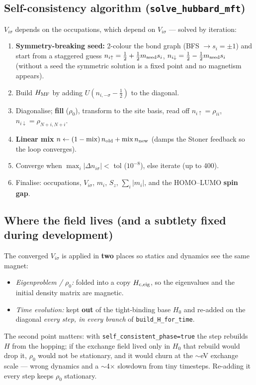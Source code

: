 \documentclass[11pt]{article}
\newcommand{\code}[1]{\texttt{\small #1}}
\begin{document}
\subsection{Self-consistency algorithm (\texttt{solve\_hubbard\_mft})}
$V_{i\sigma}$ depends on the occupations, which depend on $V_{i\sigma}$ --- solved
by iteration:
\begin{enumerate}
\item \textbf{Symmetry-breaking seed:} 2-colour the bond graph (BFS
$\to s_i=\pm1$) and start from a staggered guess
$n_{i\uparrow}=\tfrac12+\tfrac12 m_{\rm seed}s_i$,
$n_{i\downarrow}=\tfrac12-\tfrac12 m_{\rm seed}s_i$ (without a seed the symmetric
solution is a fixed point and no magnetism appears).
\item Build $H_{\rm MF}$ by adding $U(n_{i,-\sigma}-\tfrac12)$ to the diagonal.
\item Diagonalise; \textbf{fill} ($\rho_0$), transform to the site basis, read off
$n_{i\uparrow}=\rho_{ii}$, $n_{i\downarrow}=\rho_{N+i,N+i}$.
\item \textbf{Linear mix} $n\leftarrow(1-{\rm mix})\,n_{\rm old}+{\rm mix}\,n_{\rm new}$
(damps the Stoner feedback so the loop converges).
\item Converge when $\max_i|\Delta n_{i\sigma}|<$ tol ($10^{-8}$), else iterate
(up to 400).
\item Finalise: occupations, $V_{i\sigma}$, $m_i$, $S_z$, $\sum_i|m_i|$, and the
HOMO--LUMO \textbf{spin gap}.
\end{enumerate}

\subsection{Where the field lives (and a subtlety fixed during development)}
The converged $V_{i\sigma}$ is applied in \textbf{two} places so statics and
dynamics see the same magnet:
\begin{itemize}
\item \emph{Eigenproblem / $\rho_0$:} folded into a copy $H_{\rm c,eig}$, so the
eigenvalues and the initial density matrix are magnetic.
\item \emph{Time evolution:} kept \textbf{out} of the tight-binding base $H_0$
and re-added on the diagonal \emph{every step, in every branch} of
\code{build\_H\_for\_time}.
\end{itemize}
The second point matters: with \code{self\_consistent\_phase=true} the step
rebuilds $H$ from the hopping; if the exchange field lived only in $H_0$ that
rebuild would drop it, $\rho_0$ would not be stationary, and it would churn at
the $\sim$eV exchange scale --- wrong dynamics and a $\sim$4$\times$ slowdown from
tiny timesteps. Re-adding it every step keeps $\rho_0$ stationary.
\end{document}
